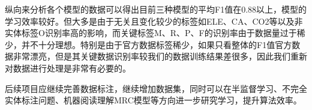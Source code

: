 \documentclass{article}
\begin{document}
纵向来分析各个模型的数据可以得出目前三种模型的平均F1值在0.88以上，模型的学习效率较好。但大多是由于无关且变化较少的标签如ELE、CA、CO2等以及非实体标签O识别率高的影响，而关键标签M、R、P、F的识别率由于数据量过于稀少，并不十分理想。特别是由于官方数据标签稀少，如果只看整体的F1值官方数据非常漂亮，但是其关键数据识别率较我们的数据训练结果差很多，因此我们重新对数据进行处理是非常有必要的。

后续项目应继续完善数据标注，继续增加数据集，同时可以在半监督学习、不完全实体标注问题、机器阅读理解MRC模型等方向进一步研究学习，提升算法效率。

\newpage

\begin{center}
	
\end{center}
\end{document}
